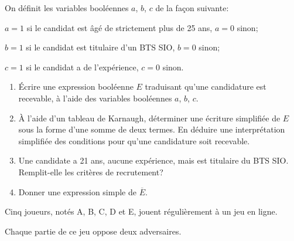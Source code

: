 \documentclass[a4paper,12pt,french]{article}
\begin{document}
\smallskip

\begin{list}{\textbullet}{On définit les variables booléennes $a$, $b$, $c$ de la façon suivante:}
	\item $a=1$ si le candidat est âgé de strictement plus de 25 ans, $a=0$ sinon;
	\item $b=1$ si le candidat est titulaire d'un BTS SIO, $b=0$ sinon;
	\item $c=1$ si le candidat a de l'expérience, $c=0$ sinon.
\end{list}

\begin{enumerate}[\bfseries 1.]
	\item Écrire une expression booléenne $E$ traduisant qu'une candidature est recevable, à l'aide des variables booléennes $a$, $b$, $c$.
	\item À l'aide d'un tableau de Karnaugh, déterminer une écriture simplifiée de $E$ sous la forme d'une somme de deux termes. En déduire une interprétation simplifiée des conditions pour qu'une candidature soit recevable.
	\item Une candidate a 21 ans, aucune expérience, mais est titulaire du BTS SIO. Remplit-elle les critères de recrutement?
	\item Donner une expression simple de $\overline{E}$.\\
\end{enumerate}


Cinq joueurs, notés A, B, C, D et E, jouent régulièrement à un jeu en ligne.

Chaque partie de ce jeu oppose deux adversaires.
\end{document}

